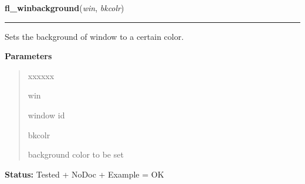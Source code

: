 \hspace{.8\funcindent}\begin{boxedminipage}{\funcwidth}

    \raggedright \textbf{fl\_winbackground}(\textit{win}, \textit{bkcolr})

    \vspace{-1.5ex}

    \rule{\textwidth}{0.5\fboxrule}
\setlength{\parskip}{2ex}
    Sets the background of window to a certain color.

\setlength{\parskip}{1ex}
      \textbf{Parameters}
      \vspace{-1ex}

      \begin{quote}
        \begin{Ventry}{xxxxxx}

          \item[win]

          window id

          \item[bkcolr]

          background color to be set

        \end{Ventry}

      \end{quote}

\textbf{Status:} Tested + NoDoc + Example = OK



    \end{boxedminipage}

    \label{xformslib:library:fl_winbackground}

    \vspace{0.5ex}

